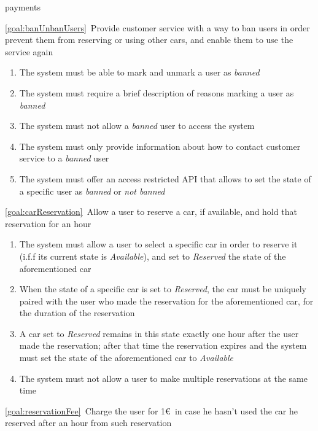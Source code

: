 \begin{description}
\begin{enumerate}[resume*]
  				payments
  			\end{enumerate}
  		\item \ref{goal:banUnbanUsers}\ Provide customer service with a way to ban users in order
  		prevent them from reserving or using other cars, and enable them to use the service again
  			\begin{enumerate}[resume*]
  				\item The system must be able to mark and unmark a user as \emph{banned} 
  				\item The system must require a brief description of reasons marking a user as
  				\emph{banned}
  				\item The system must not allow a \emph{banned} user to access the system
   				\item The system must only provide information about how to contact customer
   				service to a \emph{banned} user
   				\item The system must offer an access restricted API that allows to set the state of a
   				specific user as \emph{banned} or \emph{not banned}
   			\end{enumerate}
 	  	\item \ref{goal:carReservation}\ Allow a user to reserve a car, if available, and hold that
 	  	reservation for an hour
 	  		\begin{enumerate}[resume*]
 	  			\item The system must allow a user to select a specific car in order to reserve it 
 	  			(i.f.f its current state is \emph{Available}), and set to \emph{Reserved} the state of
 	  			the aforementioned car
 	  			\item When the state of a specific car is set to \emph{Reserved}, the car must be
 	  			uniquely paired with the user who made the reservation for the aforementioned car, for
 	  			the duration of the reservation
 	  			\item A car set to \emph{Reserved} remains in this state exactly one hour after the user
 	  			made the reservation; after that time the reservation expires and the system
 	  			must set the state of the aforementioned car to \emph{Available}
 	  			\item The system must not allow a user to make multiple reservations at the same time
   			\end{enumerate}
  		\item \ref{goal:reservationFee}\ Charge the user for 1\euro\ in case he hasn't used the car he reserved after an hour from such reservation

\end{description}
